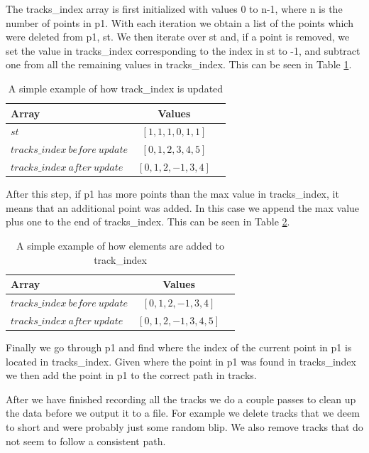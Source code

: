 \documentclass[12pt, onecolumn, conference]{IEEEtran}
\begin{document}
The tracks\_index array is first initialized with values 0 to n-1, where n is the number of points in p1. With each iteration we obtain a list of the points which were deleted from p1, st. We then iterate over st and, if a point is removed, we set the value in tracks\_index corresponding to the index in st to -1, and subtract one from all the remaining values in tracks\_index. This can be seen in Table \ref{table_index}.

\begin{table}[!t]
\caption{A simple example of how track\_index is updated}
\label{table_index}
\centering
\begin{tabular}{ | l | c | r | }
 \hline
 Array & Values\\
  \hline                 
  $st$ & $[1, 1, 1, 0, 1, 1]$\\
  $tracks\_index\ before\ update$ & $[0, 1, 2, 3, 4, 5]$ \\
  $tracks\_index\ after\ update$ & $[0, 1, 2, -1, 3, 4]$ \\
  \hline  
\end{tabular}
\end{table}

After this step, if p1 has more points than the max value in tracks\_index, it means that an additional point was added. In this case we append the max value plus one to the end of tracks\_index. This can be seen in Table \ref{table_index_add}.

\begin{table}[!t]
\caption{A simple example of how elements are added to track\_index}
\label{table_index_add}
\centering
\begin{tabular}{ | l | c | r | }
 \hline
 Array & Values\\
  \hline           
  $tracks\_index\ before\ update$ & $[0, 1, 2, -1, 3, 4]$ \\
  $tracks\_index\ after\ update$ & $[0, 1, 2, -1, 3, 4, 5]$ \\
  \hline  
\end{tabular}
\end{table}

Finally we go through p1 and find where the index of the current point in p1 is located in tracks\_index. Given where the point in p1 was found in tracks\_index we then add the point in p1 to the correct path in tracks.

After we have finished recording all the tracks we do a couple passes to clean up the data before we output it to a file. For example we delete tracks that we deem to short and were probably just some random blip. We also remove tracks that do not seem to follow a consistent path.
\end{document}

